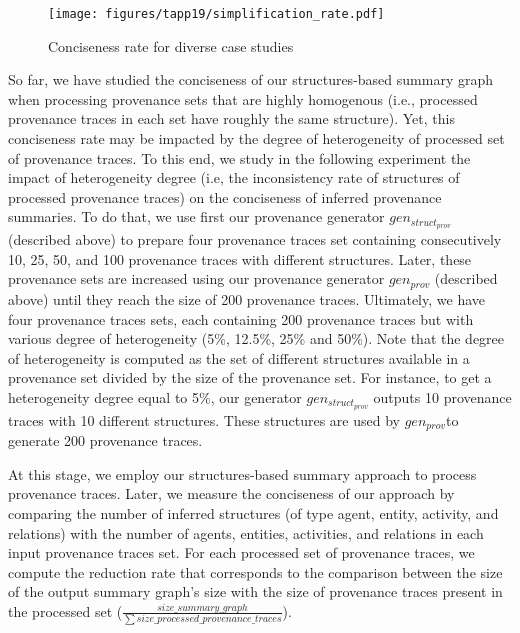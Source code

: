 {\begin{figure}[t]
  \centering
  \texttt{[image: figures/tapp19/simplification\_rate.pdf]}
  \caption{Conciseness rate for diverse case studies}
  \label{fig:exper1}
\end{figure}

 So far, we have studied the conciseness of our structures-based summary graph when processing provenance sets that are highly homogenous (i.e., processed provenance traces in each set have roughly the same structure). Yet, this conciseness rate may be impacted by the degree of heterogeneity of processed set of provenance traces. 
To this end, we study in the following experiment the impact of heterogeneity degree (i.e, the inconsistency rate of structures of processed provenance traces) on the conciseness of inferred provenance summaries. 
To do that, we use first our provenance generator  $gen_{struct_{prov}}$ (described above) to prepare four provenance traces set containing consecutively 10, 25, 50, and 100 provenance traces with different structures. Later, these provenance sets are increased using our provenance generator $gen_{prov}$ (described above) until they reach the size of 200 provenance traces. Ultimately, we have four provenance traces sets, each containing 200 provenance traces but with various degree of heterogeneity (5\%, 12.5\%, 25\% and 50\%).
Note that the degree of heterogeneity is computed as the set of different structures available in a provenance set divided by the size of the provenance set.
For instance, to get a heterogeneity degree equal to 5\%, our generator $gen_{struct_{prov}}$ outputs 10 provenance traces with 10 different structures. These structures are used by $gen_{prov}$to generate 200 provenance traces.

At this stage, we employ our structures-based summary approach to process provenance traces. Later, we measure the conciseness of our approach by comparing the number of inferred structures (of type agent, entity, activity, and relations) with the number of agents, entities, activities, and relations in each input provenance traces set.
For each processed set of provenance traces, we compute the reduction rate that corresponds to the comparison between the size of the output summary graph's size with the size of provenance traces present in the processed set ($\frac{size\_summary\_graph }{\sum size\_processed\_provenance\_traces}$).

}
